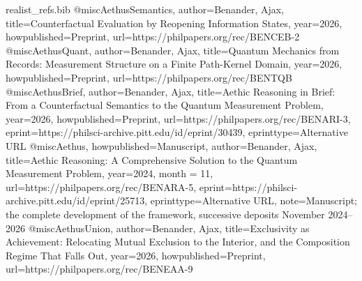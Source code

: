 \begin{filecontents}{realist_refs.bib}
@misc{AethusSemantics, author={Benander, Ajax}, title={Counterfactual Evaluation by Reopening Information States}, year={2026}, howpublished={Preprint}, url={https://philpapers.org/rec/BENCEB-2}}
@misc{AethusQuant, author={Benander, Ajax}, title={Quantum Mechanics from Records: Measurement Structure on a Finite Path-Kernel Domain}, year={2026}, howpublished={Preprint}, url={https://philpapers.org/rec/BENTQB}}
@misc{AethusBrief, author={Benander, Ajax}, title={Aethic Reasoning in Brief: From a Counterfactual Semantics to the Quantum Measurement Problem}, year={2026}, howpublished={Preprint}, url={https://philpapers.org/rec/BENARI-3}, eprint={https://philsci-archive.pitt.edu/id/eprint/30439}, eprinttype={Alternative URL}}
@misc{Aethus, howpublished={Manuscript}, author={Benander, Ajax}, title={Aethic Reasoning: A Comprehensive Solution to the Quantum Measurement Problem}, year={2024}, month = {11}, url={https://philpapers.org/rec/BENARA-5}, eprint={https://philsci-archive.pitt.edu/id/eprint/25713}, eprinttype={Alternative URL}, note={Manuscript; the complete development of the framework, successive deposits November 2024--2026}}
@misc{AethusUnion, author={Benander, Ajax}, title={Exclusivity as Achievement: Relocating Mutual Exclusion to the Interior, and the Composition Regime That Falls Out}, year={2026}, howpublished={Preprint}, url={https://philpapers.org/rec/BENEAA-9}}


\end{filecontents}
